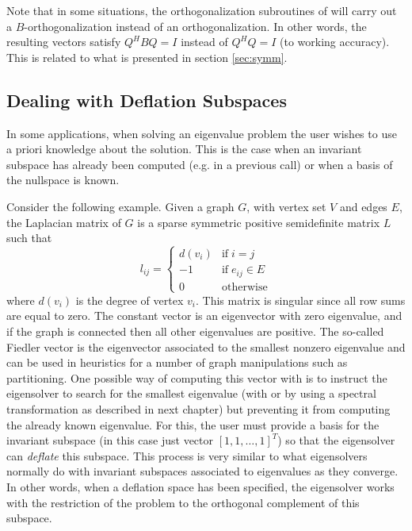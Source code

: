 	Note that in some situations, the orthogonalization subroutines of \slepc will carry out a $B$-orthogonalization instead of an orthogonalization. In other words, the resulting vectors satisfy $Q^H\!BQ=I$ instead of $Q^HQ=I$ (to working accuracy). This is related to what is presented in section \ref{sec:symm}.

\subsection{Dealing with Deflation Subspaces}

	In some applications, when solving an eigenvalue problem the user wishes to use a priori knowledge about the solution. This is the case when an invariant subspace has already been computed (e.g. in a previous  call) or when a basis of the nullspace is known.

	Consider the following example. Given a graph $G$, with vertex set $V$ and edges $E$, the Laplacian matrix of $G$ is a sparse symmetric positive semidefinite matrix $L$ such that
$$l_{ij}=\left\{\begin{array}{cl}
         d(v_i) & \mathrm{if}\;i=j\\
         -1 & \mathrm{if}\;e_{ij}\in E\\
         0&\mathrm{otherwise}
\end{array}\right.$$
where $d(v_i)$ is the degree of vertex $v_i$. This matrix is singular since all row sums are equal to zero. The constant vector is an eigenvector with zero eigenvalue, and if the graph is connected then all other eigenvalues are positive. The so-called Fiedler vector is the eigenvector associated to the smallest nonzero eigenvalue and can be used in heuristics for a number of graph manipulations such as partitioning. One possible way of computing this vector with \slepc is to instruct the eigensolver to search for the smallest eigenvalue (with  or by using a spectral transformation as described in next chapter) but preventing it from computing the already known eigenvalue. For this, the user must provide a basis for the invariant subspace (in this case just vector $[1,1,\ldots,1]^T$) so that the eigensolver can \emph{deflate} this subspace. This process is very similar to what eigensolvers normally do with invariant subspaces associated to eigenvalues as they converge. In other words, when a deflation space has been specified, the eigensolver works with the restriction of the problem to the orthogonal complement of this subspace.

